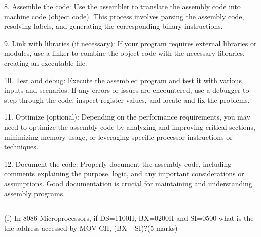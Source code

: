 \documentclass[article]{article}
\begin{document}
{8. Assemble the code: Use the assembler to translate the assembly code into machine code (object code). This process involves parsing the assembly code, resolving labels, and generating the corresponding binary instructions.

9. Link with libraries (if necessary): If your program requires external libraries or modules, use a linker to combine the object code with the necessary libraries, creating an executable file.

10. Test and debug: Execute the assembled program and test it with various inputs and scenarios. If any errors or issues are encountered, use a debugger to step through the code, inspect register values, and locate and fix the problems.

11. Optimize (optional): Depending on the performance requirements, you may need to optimize the assembly code by analyzing and improving critical sections, minimizing memory usage, or leveraging specific processor instructions or techniques.

12. Document the code: Properly document the assembly code, including comments explaining the purpose, logic, and any important considerations or assumptions. Good documentation is crucial for maintaining and understanding assembly programs.

}
\subsection*{}(f) In 8086 Microprocessors, if DS=1100H, BX=0200H and SI=0500 what is the the
address accessed by MOV CH, (BX +SI)?(5 marks) 
\end{document}
